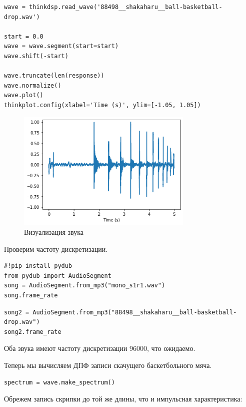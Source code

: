 \documentclass[a4paper,12pt]{report}
\begin{document}
\begin{lstlisting}[caption=Загрузка звука]
wave = thinkdsp.read_wave('88498__shakaharu__ball-basketball-drop.wav')

start = 0.0
wave = wave.segment(start=start)
wave.shift(-start)

wave.truncate(len(response))
wave.normalize()
wave.plot()
thinkplot.config(xlabel='Time (s)', ylim=[-1.05, 1.05])
\end{lstlisting}

\begin{figure}[H]
        \centering
        \includegraphics[width=0.75\textwidth]{lab10_fig2_4.png}
        \caption{Визуализация звука}
        \label{fig:lab10_fig2_4}
\end{figure}

Проверим частоту дискретизации.

\begin{lstlisting}[caption=Частота дискретизации первого звука]
#!pip install pydub
from pydub import AudioSegment
song = AudioSegment.from_mp3("mono_s1r1.wav")
song.frame_rate
\end{lstlisting}

\begin{lstlisting}[caption=Частота дискретизации второго звука]
song2 = AudioSegment.from_mp3("88498__shakaharu__ball-basketball-drop.wav")
song2.frame_rate
\end{lstlisting}

Оба звука имеют частоту дискретизации 96000, что ожидаемо.

Теперь мы вычисляем ДПФ записи скачущего баскетбольного мяча.

\begin{lstlisting}[caption=Спектр звука]
spectrum = wave.make_spectrum()
\end{lstlisting}

Обрежем запись скрипки до той же длины, что и импульсная характеристика:
\end{document}
